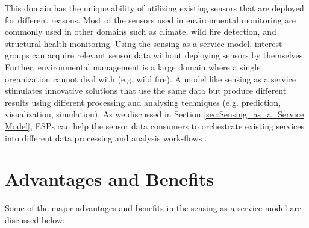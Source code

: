 \documentclass[times]{ettauth}
\begin{document}
This domain has the unique ability of utilizing existing sensors that are deployed for different reasons. Most of the sensors used in environmental monitoring are commonly used in other domains such as climate, wild fire detection, and structural health monitoring. Using the sensing as a service model, interest groups can acquire relevant sensor data without deploying sensors by themselves. Further, environmental management is a large domain where a single organization cannot deal with (e.g. wild fire). A model like sensing as a service stimulates innovative solutions that use the same data but produce different results using different processing and analysing techniques (e.g. prediction, visualization, simulation). As we discussed in Section \ref{sec:Sensing_as_a_Service Model}, ESPs can help the sensor data consumers to orchestrate existing services into different data processing \cite{P672} and analysis work-flows \cite{P635}.













\section{Advantages and Benefits}
\label{sec:Advantages}

Some of the major advantages and benefits in the sensing as a service model are discussed below:
\end{document}

